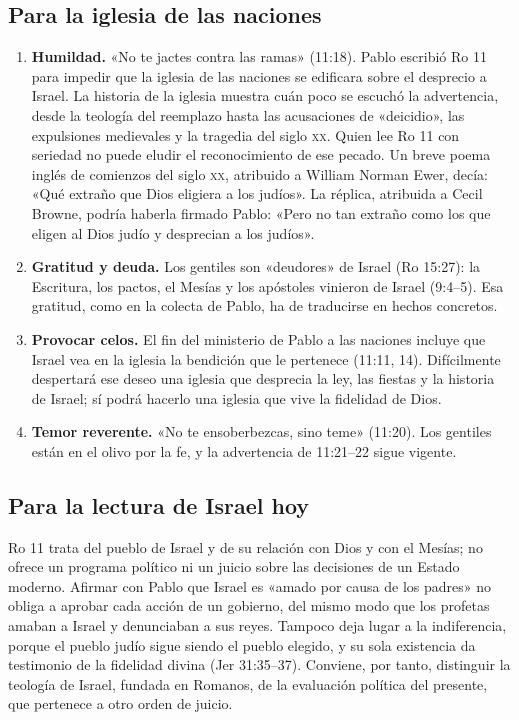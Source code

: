 \subsection{Para la iglesia de las naciones}
\begin{enumerate}
\item \textbf{Humildad.} «No te jactes contra las ramas» (11:18). Pablo escribió Ro 11 para impedir que la iglesia de las naciones se edificara sobre el desprecio a Israel. La historia de la iglesia muestra cuán poco se escuchó la advertencia, desde la teología del reemplazo hasta las acusaciones de «deicidio», las expulsiones medievales y la tragedia del siglo \textsc{xx}. Quien lee Ro 11 con seriedad no puede eludir el reconocimiento de ese pecado. Un breve poema inglés de comienzos del siglo \textsc{xx}, atribuido a William Norman Ewer, decía: «Qué extraño que Dios eligiera a los judíos». La réplica, atribuida a Cecil Browne, podría haberla firmado Pablo: «Pero no tan extraño como los que eligen al Dios judío y desprecian a los judíos».
\item \textbf{Gratitud y deuda.} Los gentiles son «deudores» de Israel (Ro 15:27): la Escritura, los pactos, el Mesías y los apóstoles vinieron de Israel (9:4--5). Esa gratitud, como en la colecta de Pablo, ha de traducirse en hechos concretos.
\item \textbf{Provocar celos.} El fin del ministerio de Pablo a las naciones incluye que Israel vea en la iglesia la bendición que le pertenece (11:11, 14). Difícilmente despertará ese deseo una iglesia que desprecia la ley, las fiestas y la historia de Israel; sí podrá hacerlo una iglesia que vive la fidelidad de Dios.
\item \textbf{Temor reverente.} «No te ensoberbezcas, sino teme» (11:20). Los gentiles están en el olivo por la fe, y la advertencia de 11:21--22 sigue vigente.
\end{enumerate}

\subsection{Para la lectura de Israel hoy}
Ro 11 trata del pueblo de Israel y de su relación con Dios y con el Mesías; no ofrece un programa político ni un juicio sobre las decisiones de un Estado moderno. Afirmar con Pablo que Israel es «amado por causa de los padres» no obliga a aprobar cada acción de un gobierno, del mismo modo que los profetas amaban a Israel y denunciaban a sus reyes. Tampoco deja lugar a la indiferencia, porque el pueblo judío sigue siendo el pueblo elegido, y su sola existencia da testimonio de la fidelidad divina (Jer 31:35--37). Conviene, por tanto, distinguir la teología de Israel, fundada en Romanos, de la evaluación política del presente, que pertenece a otro orden de juicio.

